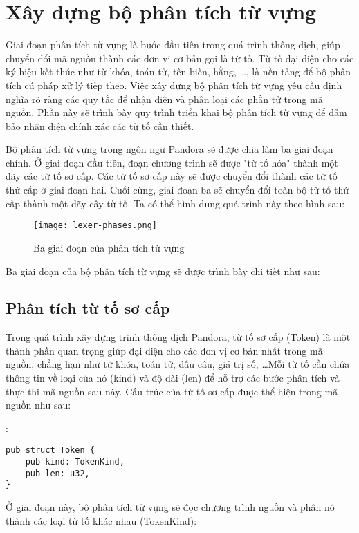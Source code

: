 \section{Xây dựng bộ phân tích từ vựng}
\label{ch3:lexer-analysis}
    Giai đoạn phân tích từ vựng là bước đầu tiên trong quá trình thông dịch, giúp chuyển đổi mã nguồn thành các đơn vị cơ bản gọi là từ tố. Từ tố đại diện cho các ký hiệu kết thúc như từ khóa, toán tử, tên biến, hằng, \dots, là nền tảng để bộ phân tích cú pháp xử lý tiếp theo. Việc xây dựng bộ phân tích từ vựng yêu cầu định nghĩa rõ ràng các quy tắc để nhận diện và phân loại các phần tử trong mã nguồn. Phần này sẽ trình bày quy trình triển khai bộ phân tích từ vựng để đảm bảo nhận diện chính xác các từ tố cần thiết.

    Bộ phân tích từ vựng trong ngôn ngữ Pandora sẽ được chia làm ba giai đoạn chính. Ở giai đoạn đầu tiên, đoạn chương trình sẽ được "từ tố hóa" thành một dãy các từ tố sơ cấp. Các từ tố sơ cấp này sẽ được chuyển đổi thành các từ tố thứ cấp ở giai đoạn hai. Cuối cùng, giai đoạn ba sẽ chuyển đổi toàn bộ từ tố thứ cấp thành một dãy cây từ tố. Ta có thể hình dung quá trình này theo hình sau:

\begin{figure}[H]
    \centering
    \texttt{[image: lexer-phases.png]}
    \caption{Ba giai đoạn của phân tích từ vựng}
\end{figure}

    Ba giai đoạn của bộ phân tích từ vựng sẽ được trình bày chi tiết như sau:

\subsection{Phân tích từ tố sơ cấp}
    Trong quá trình xây dựng trình thông dịch Pandora, từ tố sơ cấp (Token) là một thành phần quan trọng giúp đại diện cho các đơn vị cơ bản nhất trong mã nguồn, chẳng hạn như từ khóa, toán tử, dấu câu, giá trị số, \dots Mỗi từ tố cần chứa thông tin về loại của nó (kind) và độ dài (len) để hỗ trợ các bước phân tích và thực thi mã nguồn sau này. Cấu trúc của từ tố sơ cấp được thể hiện trong mã nguồn như sau:

\noindent {}:
\begin{lstlisting}[]
pub struct Token {
    pub kind: TokenKind,
    pub len: u32,
}
\end{lstlisting}

    Ở giai đoạn này, bộ phân tích từ vựng sẽ đọc chương trình nguồn và phân nó thành các loại từ tố khác nhau (TokenKind):


